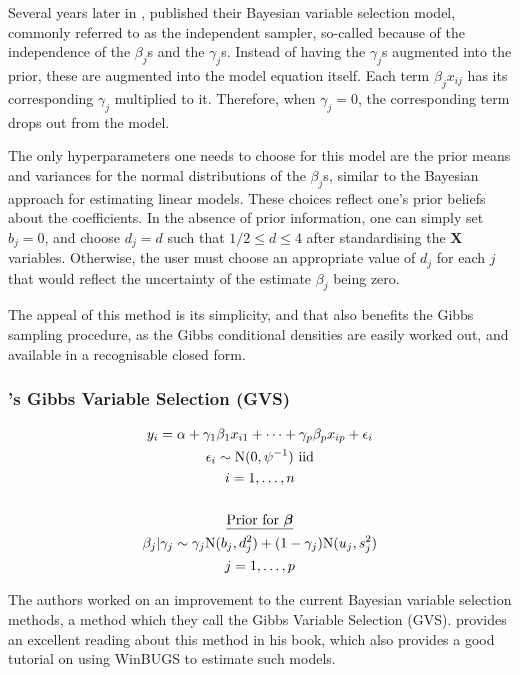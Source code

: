 Several years later in \citeyear{Kuo1998}, \citeauthor{Kuo1998} published their Bayesian variable selection model, commonly referred to as the independent sampler, so-called because of the independence of the $\beta_j$s and the $\gamma_j$s. Instead of having the $\gamma_j$s augmented into the prior, these are augmented into the model equation itself. Each term $\beta_j x_{ij}$ has its corresponding $\gamma_j$ multiplied to it. Therefore, when $\gamma_j=0$, the corresponding term drops out from the model.

The only hyperparameters one needs to choose for this model are the prior means and variances for the normal distributions of the $\beta_j$s, similar to the Bayesian approach for estimating linear models. These choices reflect one's prior beliefs about the coefficients. In the absence of prior information, one can simply set $b_j=0$, and choose $d_j=d$ such that $1/2 \leq d \leq 4$ after standardising the $\mathbf X$ variables. Otherwise, the user must choose an appropriate value of $d_j$ for each $j$ that would reflect the uncertainty of the estimate $\beta_j$ being zero.

The appeal of this method is its simplicity, and that also benefits the Gibbs sampling procedure, as the Gibbs conditional densities are easily worked out, and available in a recognisable closed form.

\subsubsection{\texorpdfstring{\citeauthor{Dellaportas2002}'s}{Dellaportas et al.'s} Gibbs Variable Selection (GVS)}
\label{sec:dellaportas}

\begin{align}
	\begin{gathered} 
		y_i = \alpha + \gamma_1\beta_1 x_{i1} + \dots + \gamma_p\beta_p x_{ip} + \epsilon_i \\
		\epsilon_i \sim \text{N}(0, \psi^{-1}) \text{ iid} \\
		i = 1,\dots,n \\
		\\
		\text{\underline{Prior for $\boldsymbol\beta$}} \\
		\beta_j|\gamma_j \sim \gamma_j\text{N}(b_j,d_j^2) + (1-\gamma_j)\text{N}(u_j,s^2_j) \\
		j=1,\dots,p
	\end{gathered}
\end{align}

The authors \cite{Dellaportas2002} worked on an improvement to the current Bayesian variable selection methods, a method which they call the Gibbs Variable Selection (GVS). \cite{Ntzoufras2008} provides an excellent reading about this method in his book, which also provides a good tutorial on using WinBUGS to estimate such models.

